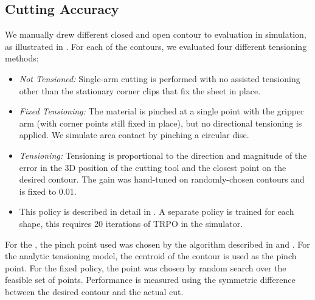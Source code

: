 \subsection*{Cutting Accuracy}
\label{sec:policyeval}
We manually drew \numshapes different closed and open contour to evaluation in simulation, as illustrated in  . 
For each of the contours, we evaluated four different tensioning methods:
\begin{itemize}
\item \emph{Not Tensioned:} Single-arm cutting is performed with no assisted tensioning other than the stationary corner clips that fix the sheet in place.
\item \emph{Fixed Tensioning:} The material is pinched at a single point with the gripper arm (with corner points still fixed in place), but no directional tensioning is applied. We simulate area contact by pinching a circular disc.
\item \emph{\analyticname Tensioning:} Tensioning is proportional to the direction and magnitude of the error in the  3D position of the cutting tool and the closest point on the desired contour. The gain was hand-tuned on randomly-chosen contours and is fixed to 0.01.
\item \emph{\tpsalgo } This policy is described in detail in . A separate policy is trained for each shape, this requires 20 iterations of TRPO in the simulator.
\end{itemize}

\vspace{0.5em}

For the \tpsalgo, the pinch point used was  chosen by the algorithm described in  and . For the analytic tensioning model, the centroid of the contour is used as the pinch point. For the fixed policy, the point was chosen by random search over the feasible set of points.
Performance is measured using the symmetric difference between the desired contour and the actual cut.

